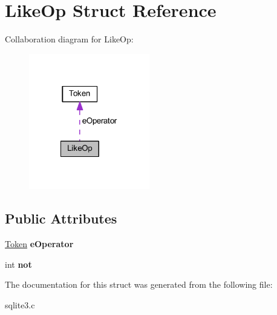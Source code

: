 \hypertarget{struct_like_op}{\section{Like\-Op Struct Reference}
\label{struct_like_op}
}


Collaboration diagram for Like\-Op\-:\nopagebreak
\begin{figure}[H]
\begin{center}
\leavevmode
\includegraphics[width=149pt]{struct_like_op__coll__graph}
\end{center}
\end{figure}
\subsection*{Public Attributes}
\begin{DoxyCompactItemize}
\item 
\hypertarget{struct_like_op_a02dccb0eea9610285333434a755acae8}{\hyperlink{struct_token}{Token} {\bfseries e\-Operator}}\label{struct_like_op_a02dccb0eea9610285333434a755acae8}

\item 
\hypertarget{struct_like_op_a876c098f6889c662bd4616e83b09ff0d}{int {\bfseries not}}\label{struct_like_op_a876c098f6889c662bd4616e83b09ff0d}

\end{DoxyCompactItemize}


The documentation for this struct was generated from the following file\-:\begin{DoxyCompactItemize}
\item 
sqlite3.\-c\end{DoxyCompactItemize}
